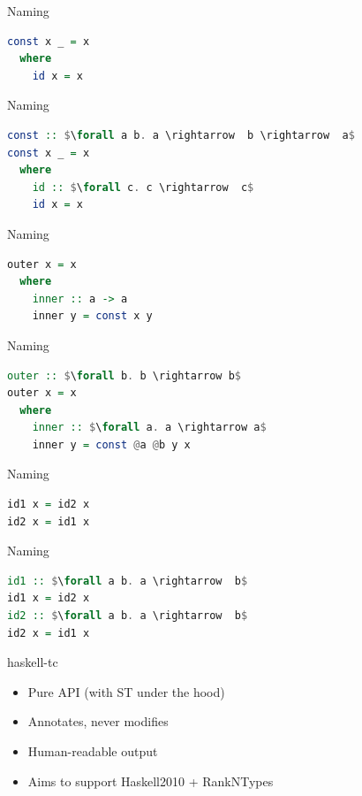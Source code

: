 \documentclass[pdf]{beamer}
\begin{document}
\begin{frame}[fragile]{Naming}
\begin{lstlisting}[language=Haskell]
const x _ = x
  where
    id x = x
\end{lstlisting}
\end{frame}

\begin{frame}[fragile]{Naming}
\begin{lstlisting}[language=Haskell,mathescape=true]
const :: $\forall a b. a \rightarrow  b \rightarrow  a$
const x _ = x
  where
    id :: $\forall c. c \rightarrow  c$
    id x = x
\end{lstlisting}
\end{frame}




\begin{frame}[fragile]{Naming}
\begin{lstlisting}[language=Haskell,mathescape=true]
outer x = x
  where
    inner :: a -> a
    inner y = const x y
\end{lstlisting}
\end{frame}

\begin{frame}[fragile]{Naming}
\begin{lstlisting}[language=Haskell,mathescape=true]
outer :: $\forall b. b \rightarrow b$
outer x = x
  where
    inner :: $\forall a. a \rightarrow a$
    inner y = const @a @b y x
\end{lstlisting}
\end{frame}





\begin{frame}[fragile]{Naming}
\begin{lstlisting}[language=Haskell,mathescape=true]
id1 x = id2 x
id2 x = id1 x
\end{lstlisting}
\end{frame}

\begin{frame}[fragile]{Naming}
\begin{lstlisting}[language=Haskell,mathescape=true]
id1 :: $\forall a b. a \rightarrow  b$
id1 x = id2 x
id2 :: $\forall a b. a \rightarrow  b$
id2 x = id1 x
\end{lstlisting}
\end{frame}

\begin{frame}
  \Large{haskell-tc}
  \begin{itemize}
    \item Pure API (with ST under the hood)
    \item Annotates, never modifies
    \item Human-readable output
    \item Aims to support Haskell2010 + RankNTypes
  \end{itemize}
\end{frame}
\end{document}

